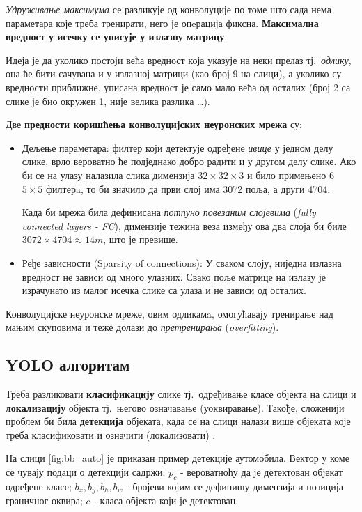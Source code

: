 \documentclass[12pt, а4paper]{article}
\begin{document}
\textit{Удруживање максимума} се разликује од конволуције по томе што сада нема
параметара које треба тренирати, него је опeрација фиксна. \textbf{Максимална
вредност у исечку се уписује у излазну матрицу}.

Идеја је да уколико постоји већа вредност која указује на неки
прелаз тј.\ \textit{одлику}, она ће бити сачувана и у излазној
матрици (као број 9 на слици), а
уколико су вредности приближне, уписана вредност је само мало већа од
осталих (број 2 са слике је био окружен 1, није велика разлика \dots).

Две \textbf{предности коришћења конволуцијских неуронских мрежа} су:
\begin{itemize}
 \item Дељење параметара: филтер који детектује одређене \textit{ивице}
 у једном делу слике, врло вероватно ће подједнако добро радити
 и у другом делу слике. Ако би се на улазу
 налазила слика димензија $32 \times 32 \times 3$ и било
 примењено 6 $5 \times 5$ филтерa, то би значило да први слој има 3072 поља, а
 други 4704.
 
 Када би мрежа била дефинисана \textit{потпуно повезаним слојевима}
 (\textit{fully connected layers - FC}), димензије тежина веза између ова два слоја
 би биле \mbox{$3072 \times 4704 \approx 14m$}, што је превише.
 \item Ређе зависности (Sparsity of connections): У сваком слоју,
 ниједна излазна вредност не зависи од много улазних. Свако поље матрице на излазу је
 израчунато из малог исечка слике са улаза и не зависи од осталих.
\end{itemize}

Конволуцијске неуронске мреже, овим одликамa, омогућавају тренирање над мањим скуповима и 
теже долази до \textit{претренирања} (\textit{overfitting}).
\newpage
\subsection{YOLO алгоритам}
Треба разликовати \textbf{класификацију} слике тј.\ одређивање класе
објекта на слици и \textbf{локализацију} објекта тј.\ његово означавање
(уоквиравање). Такође, сложенији проблем би била
\textbf{детекција} објеката, када се на слици налази више објеката које треба
класификовати и означити (локализовати) \cite{ngObjLoc}.

На слици \ref{fig:bb_auto} је приказан пример детекције аутомобила. Вектор
у коме се чувају подаци о детекцији садржи: $p_c$ - вероватноћу да је детектован
објекат одређене класе; $b_x,b_y,b_h,b_w$ - бројеви којим се дефинишу
димензија и позиција граничног оквира; $c$ - класа објекта који је детектован.
\end{document}
